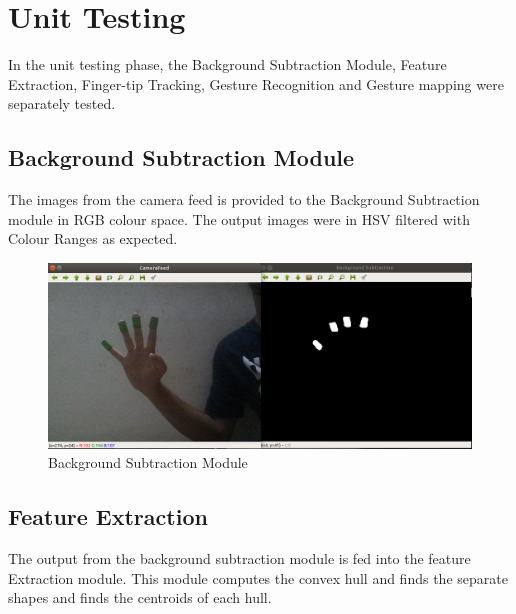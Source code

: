 \documentclass[11pt]{report}
\begin{document}
\section{Unit Testing}
In the unit testing phase, the Background Subtraction Module, Feature Extraction, Finger-tip Tracking, Gesture Recognition
and Gesture mapping were separately tested.

\subsection{Background Subtraction Module}

The images from the camera feed is provided to the Background Subtraction
module in RGB colour space. The output images were in HSV filtered with Colour Ranges as expected.

\begin{figure}[h]
    \includegraphics[width=15cm]{backgroundtesting.png}
    \caption{Background Subtraction Module}
\end{figure}

\subsection{Feature Extraction}

The output from the background subtraction module is fed into the feature Extraction
module. This module computes the convex hull and finds the separate shapes and finds the centroids of 
each hull.
\end{document}
